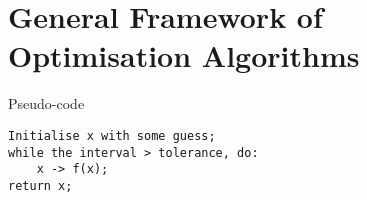 \documentclass[math, code]{amznotes}
\theoremstyle{remark}
\begin{document}
\section{General Framework of Optimisation Algorithms}
\begin{genbox}{Pseudo-code}{}
    \begin{verbatim}
Initialise x with some guess;
while the interval > tolerance, do:
    x -> f(x);
return x;
    \end{verbatim}
\end{genbox}
\end{document}
